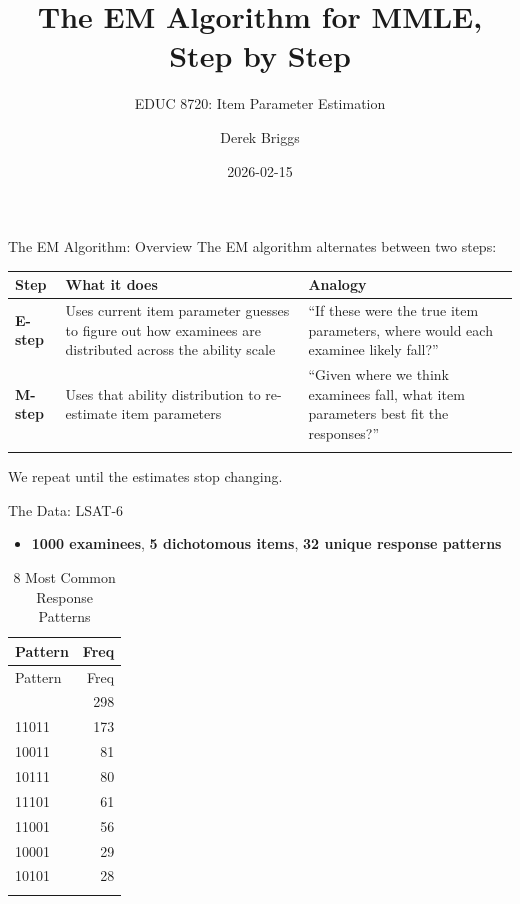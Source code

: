 \documentclass[
  ignorenonframetext,
]{beamer}
\title{The EM Algorithm for MMLE, Step by Step}
\subtitle{EDUC 8720: Item Parameter Estimation}
\author{Derek Briggs}
\date{2026-02-15}
\providecommand{\tightlist}{%
  \setlength{\itemsep}{0pt}\setlength{\parskip}{0pt}}
\begin{document}
\frame{\titlepage}

\begin{frame}{The EM Algorithm: Overview}
\label{the-em-algorithm-overview}
The EM algorithm alternates between two steps:

\begin{longtable}[]{@{}
  >{\raggedright\arraybackslash}p{}
  >{\raggedright\arraybackslash}p{}
  >{\raggedright\arraybackslash}p{}@{}}
\toprule\noalign{}
\begin{minipage}[b]{\linewidth}\raggedright
Step
\end{minipage} & \begin{minipage}[b]{\linewidth}\raggedright
What it does
\end{minipage} & \begin{minipage}[b]{\linewidth}\raggedright
Analogy
\end{minipage} \\
\midrule\noalign{}
\endhead
\textbf{E-step} & Uses current item parameter guesses to figure out how
examinees are distributed across the ability scale & ``If these were the
true item parameters, where would each examinee likely fall?'' \\
\textbf{M-step} & Uses that ability distribution to re-estimate item
parameters & ``Given where we think examinees fall, what item parameters
best fit the responses?'' \\
\bottomrule\noalign{}
\end{longtable}

We repeat until the estimates stop changing.
\end{frame}

\begin{frame}{The Data: LSAT-6}
\label{the-data-lsat-6}
\begin{itemize}
\tightlist
\item
  \textbf{1000 examinees}, \textbf{5 dichotomous items}, \textbf{32
  unique response patterns}
\end{itemize}

\begin{longtable}[]{@{}lr@{}}
\caption{8 Most Common Response Patterns}\tabularnewline
\toprule\noalign{}
Pattern & Freq \\
\midrule\noalign{}
\endfirsthead
\toprule\noalign{}
Pattern & Freq \\
\midrule\noalign{}
\endhead
11111 & 298 \\
11011 & 173 \\
10011 & 81 \\
10111 & 80 \\
11101 & 61 \\
11001 & 56 \\
10001 & 29 \\
10101 & 28 \\
\bottomrule\noalign{}
\end{longtable}
\end{frame}
\end{document}
